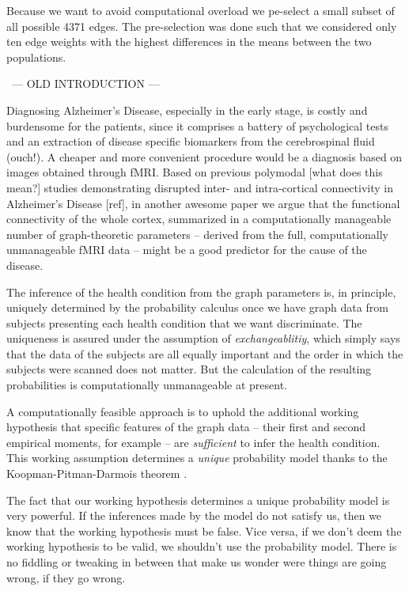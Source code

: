 \documentclass[\ifafour a4paper,12pt,\else a5paper,10pt,\fi%
onecolumn,oneside,article,%
british%
]{memoir}
\theoremstyle{remark}
\theoremstyle{innote}
\renewcommand*{\cites}{\parencites}
\renewcommand*{\|}{\mathpunct{|}}
\newcommand*{\puzzle}{\maltese}
\newcommand{\mynote}[1]{ {\footnotesize\color{notecolour}\puzzle\ #1} }
\theoremstyle{plain}
\begin{document}
Because we want to avoid computational overload we pe-select a small
subset of all possible 4371 edges. The pre-selection was done such
that we considered only ten edge weights with the highest differences
in the means between the two populations.

\mynote{--- OLD INTRODUCTION ---}

Diagnosing Alzheimer's Disease, especially in the early stage, is costly
and burdensome for the patients, since it comprises a battery of
psychological tests and an extraction of disease specific biomarkers from
the cerebrospinal fluid (ouch!). A cheaper and more convenient procedure
would be a diagnosis based on images obtained through fMRI. Based on
previous polymodal [what does this mean?] studies demonstrating disrupted
inter- and intra-cortical connectivity in Alzheimer's Disease [ref], in
another awesome paper we argue that the functional connectivity of the
whole cortex, summarized in a computationally manageable number of
graph-theoretic parameters -- derived from the full, computationally
unmanageable fMRI data -- might be a good predictor for the cause of the
disease.

The inference of the health condition from the graph parameters is, in
principle, uniquely determined by the probability calculus once we have
graph data from subjects presenting each health condition that we want
discriminate. The uniqueness is assured under the assumption of
\emph{exchangeablitiy}, which simply says that the data of the subjects are
all equally important and the order in which the subjects were scanned does
not matter. But the calculation of the resulting probabilities is
computationally unmanageable at present.

A computationally feasible approach is to uphold the additional working
hypothesis that specific features of the graph data -- their first and
second empirical moments, for example -- are \emph{sufficient} to infer the
health condition. This working assumption determines a \emph{unique}
probability model thanks to the Koopman-Pitman-Darmois theorem
\cites{koopman1936,pitman1936,darmois1935}[see
also][]{hipp1974,andersen1970,denny1967,fraser1963,barankinetal1963}.

The fact that our working hypothesis determines a unique probability model
is very powerful. If the inferences made by the model do not satisfy us,
then we know that the working hypothesis must be false. Vice versa, if we
don't deem the working hypothesis to be valid, we shouldn't use the
probability model. There is no fiddling or tweaking in between that make us
wonder were things are going wrong, if they go wrong.
\end{document}
